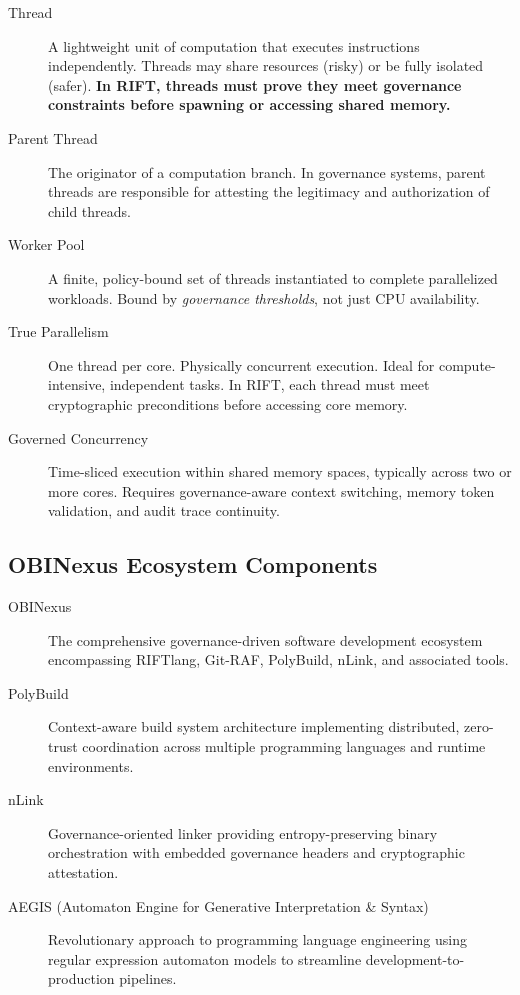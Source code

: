 \begin{description}
\item[Thread] A lightweight unit of computation that executes instructions independently. Threads may share resources (risky) or be fully isolated (safer). \textbf{In RIFT, threads must prove they meet governance constraints before spawning or accessing shared memory.}

\item[Parent Thread] The originator of a computation branch. In governance systems, parent threads are responsible for attesting the legitimacy and authorization of child threads.

\item[Worker Pool] A finite, policy-bound set of threads instantiated to complete parallelized workloads. Bound by \textit{governance thresholds}, not just CPU availability.

\item[True Parallelism] One thread per core. Physically concurrent execution. Ideal for compute-intensive, independent tasks. In RIFT, each thread must meet cryptographic preconditions before accessing core memory.

\item[Governed Concurrency] Time-sliced execution within shared memory spaces, typically across two or more cores. Requires governance-aware context switching, memory token validation, and audit trace continuity.
\end{description}

\subsection*{OBINexus Ecosystem Components}

\begin{description}
\item[OBINexus] The comprehensive governance-driven software development ecosystem encompassing RIFTlang, Git-RAF, PolyBuild, nLink, and associated tools.

\item[PolyBuild] Context-aware build system architecture implementing distributed, zero-trust coordination across multiple programming languages and runtime environments.

\item[nLink] Governance-oriented linker providing entropy-preserving binary orchestration with embedded governance headers and cryptographic attestation.

\item[AEGIS (Automaton Engine for Generative Interpretation \& Syntax)] Revolutionary approach to programming language engineering using regular expression automaton models to streamline development-to-production pipelines.
\end{description}

